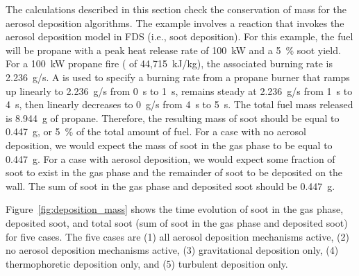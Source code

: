 \documentclass[11pt]{book}
\begin{document}
The calculations described in this section check the conservation of mass for the aerosol deposition algorithms. The example involves a reaction that invokes the aerosol deposition model in FDS (i.e., soot deposition). For this example, the fuel will be propane with a peak heat release rate of 100~kW and a 5~\% soot yield. For a 100~kW propane fire ( of 44,715~kJ/kg), the associated burning rate is 2.236~g/s. A  is used to specify a burning rate from a propane burner that ramps up linearly to 2.236~g/s from 0~s to 1~s, remains steady at 2.236~g/s from 1~s to 4~s, then linearly decreases to 0~g/s from 4~s to 5~s. The total fuel mass released is 8.944~g of propane. Therefore, the resulting mass of soot should be equal to 0.447~g, or 5~\% of the total amount of fuel. For a case with no aerosol deposition, we would expect the mass of soot in the gas phase to be equal to 0.447~g. For a case with aerosol deposition, we would expect some fraction of soot to exist in the gas phase and the remainder of soot to be deposited on the wall. The sum of soot in the gas phase and deposited soot should be 0.447~g.

Figure~\ref{fig:deposition_mass} shows the time evolution of soot in the gas phase, deposited soot, and total soot (sum of soot in the gas phase and deposited soot) for five cases. The five cases are (1) all aerosol deposition mechanisms active, (2) no aerosol deposition mechanisms active, (3) gravitational deposition only, (4) thermophoretic deposition only, and (5) turbulent deposition only.
\end{document}
